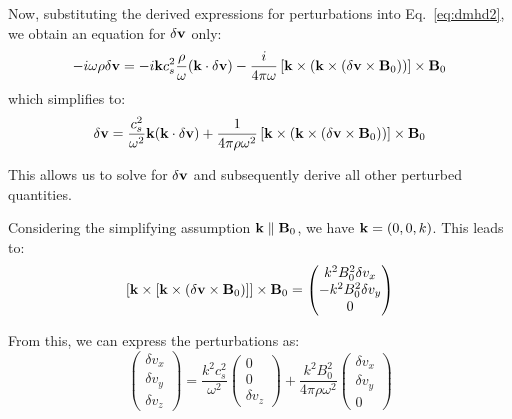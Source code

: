 
Now, substituting the derived expressions for perturbations into Eq.~\ref{eq:dmhd2}, we obtain an equation for \( \delta \vb{v} \) only:
%
\begin{equation}
-i \omega \rho \delta \vb{v} = -i \vb{k} c_s^2 \frac{\rho}{\omega}(\vb{k} \cdot \delta \vb{v}) - \frac{i}{4\pi \omega} \left[ \vb{k} \times \left(\vb{k}\times\left( \delta \vb{v} \times \vb{B}_0 \right)  \right) \right] \times \vb{B}_0
\end{equation}
%
which simplifies to:
%
\begin{equation}
\delta \vb{v} = 
\frac{c_s^2}{\omega^2} \vb{k} (\vb{k} \cdot \delta \vb{v}) 
+ \frac{1}{4\pi \rho \omega^2} \left[ \vb{k} \times \left(\vb{k}\times\left( \delta \vb{v} \times \vb{B}_0 \right)  \right) \right] \times \vb{B}_0
\end{equation}

This allows us to solve for \( \delta \vb{v} \) and subsequently derive all other perturbed quantities.

Considering the simplifying assumption \(\vb{k} \parallel \vb{B}_0\), we have \(\vb{k}=(0,0,k)\). This leads to:
%
\begin{equation}
\left[ \vb{k} \times \left[\vb{k} \times \left(\delta \vb{v} \times \vb{B}_0  \right) \right] \right] \times \vb{B}_0 = 
\begin{pmatrix}
k^2 B_0^2 \delta v_x\\
-k^2 B_0^2 \delta v_y\\
0
\end{pmatrix}
\end{equation}

From this, we can express the perturbations as:
\begin{equation}
\begin{pmatrix}
\delta v_x\\
\delta v_y\\
\delta v_z
\end{pmatrix} = \frac{k^2 c_s^2}{\omega^2} \begin{pmatrix}
0\\
0\\
\delta v_z
\end{pmatrix}+ \frac{k^2B_0^2}{4\pi \rho\omega^2} \begin{pmatrix}
\delta v_x\\
\delta v_y\\
0
\end{pmatrix}
\end{equation}

